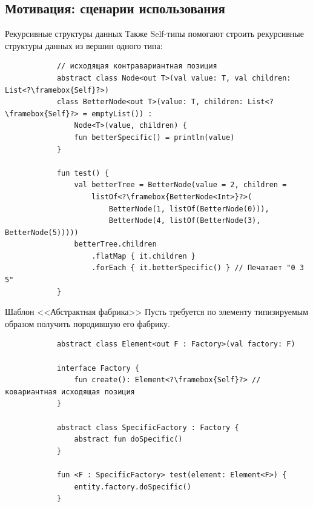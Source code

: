 \documentclass[aspectratio=169,usenames,dvipsnames]{beamer}
\begin{document}
    \subsection{Мотивация: сценарии использования}

    \begin{frame}[fragile]{Рекурсивные структуры данных}
        Также Self-типы помогают строить рекурсивные структуры данных из вершин одного типа:
        \begin{verbatim}
            // исходящая контравариантная позиция
            abstract class Node<out T>(val value: T, val children: List<?\framebox{Self}?>)
            class BetterNode<out T>(value: T, children: List<?\framebox{Self}?> = emptyList()) :
                Node<T>(value, children) {
                fun betterSpecific() = println(value)
            }

            fun test() {
                val betterTree = BetterNode(value = 2, children =
                    listOf<?\framebox{BetterNode<Int>}?>(
                        BetterNode(1, listOf(BetterNode(0))),
                        BetterNode(4, listOf(BetterNode(3), BetterNode(5)))))
                betterTree.children
                    .flatMap { it.children }
                    .forEach { it.betterSpecific() } // Печатает "0 3 5"
            }
        \end{verbatim}
    \end{frame}

    \begin{frame}[fragile]{Шаблон <<Абстрактная фабрика>>}
        Пусть требуется по элементу типизируемым образом получить породившую его фабрику.

        \begin{verbatim}
            abstract class Element<out F : Factory>(val factory: F)

            interface Factory {
                fun create(): Element<?\framebox{Self}?> // ковариантная исходящая позиция
            }

            abstract class SpecificFactory : Factory {
                abstract fun doSpecific()
            }

            fun <F : SpecificFactory> test(element: Element<F>) {
                entity.factory.doSpecific()
            }
        \end{verbatim}
    \end{frame}
\end{document}
